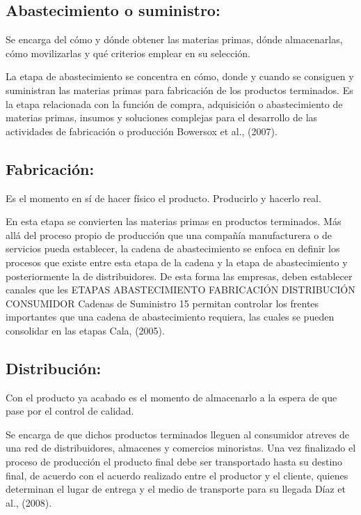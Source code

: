 \documentclass[
  jou,
  floatsintext,
  longtable,
  a4paper,
  nolmodern,
  notxfonts,
  notimes,
  12pt,
  colorlinks=true,linkcolor=blue,citecolor=blue,urlcolor=blue]{apa7}
\begin{document}
\subsection{Abastecimiento o
suministro:}\label{abastecimiento-o-suministro}

Se encarga del cómo y dónde obtener las materias primas, dónde
almacenarlas, cómo movilizarlas y qué criterios emplear en su selección.

La etapa de abastecimiento se concentra en cómo, donde y cuando se
consiguen y suministran las materias primas para fabricación de los
productos terminados. Es la etapa relacionada con la función de compra,
adquisición o abastecimiento de materias primas, insumos y soluciones
complejas para el desarrollo de las actividades de fabricación o
producción Bowersox et al., (2007).

\subsection{Fabricación:}\label{fabricaciuxf3n}

Es el momento en sí de hacer físico el producto. Producirlo y hacerlo
real.

En esta etapa se convierten las materias primas en productos terminados.
Más allá del proceso propio de producción que una compañía manufacturera
o de servicios pueda establecer, la cadena de abastecimiento se enfoca
en definir los procesos que existe entre esta etapa de la cadena y la
etapa de abastecimiento y posteriormente la de distribuidores. De esta
forma las empresas, deben establecer canales que les ETAPAS
ABASTECIMIENTO FABRICACIÓN DISTRIBUCIÓN CONSUMIDOR Cadenas de Suministro
15 permitan controlar los frentes importantes que una cadena de
abastecimiento requiera, las cuales se pueden consolidar en las etapas
Cala, (2005).

\subsection{Distribución:}\label{distribuciuxf3n}

Con el producto ya acabado es el momento de almacenarlo a la espera de
que pase por el control de calidad.

Se encarga de que dichos productos terminados lleguen al consumidor
atreves de una red de distribuidores, almacenes y comercios minoristas.
Una vez finalizado el proceso de producción el producto final debe ser
transportado hasta su destino final, de acuerdo con el acuerdo realizado
entre el productor y el cliente, quienes determinan el lugar de entrega
y el medio de transporte para su llegada Díaz et al., (2008).
\end{document}

